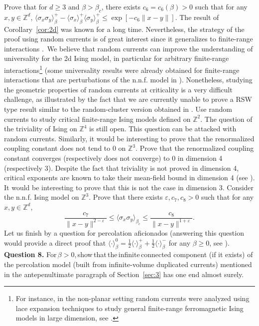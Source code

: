\documentclass[a4paper,oneside,11pt]{article}
\newcommand{\ee}{\end{equation}}
\newcommand{\be}{\begin{equation}}
\begin{document}
\medbreak
{} Prove that for $d\ge3$ and $\beta>\beta_c$, there exists $c_6=c_6(\beta)>0$ such that for any $x,y\in\mathbb Z^d$,
$
\langle \sigma_x\sigma_y\rangle_\beta^+-\langle \sigma_x\rangle_\beta^+\langle\sigma_y\rangle^+_\beta\le \exp[-c_6 \|x-y\|].
$
\medbreak
The result of Corollary~\ref{cor:2d} was known for a long time. Nevertheless, the strategy of the proof using random currents is of great interest since it generalizes to finite-range interactions \cite{AizDumWar16}.\ We believe that random currents can improve the understanding of universality for the 2d Ising model, in particular for arbitrary finite-range interactions\footnote{For instance, in the non-planar setting random currents were analyzed using lace expansion techniques to study general finite-range ferromagnetic Ising models in large dimension, see  \cite{Sak07}.} (some universality results were already obtained for finite-range interactions that are perturbations of the n.n.f. model in \cite{GiuGreMas12}). Nonetheless, studying the geometric properties of random currents at criticality is a very difficult challenge, as illustrated by the fact that we are currently unable to prove a RSW type result similar to the random-cluster version obtained in \cite{DumHonNol11}. 
\medbreak
{} Use random currents to study critical finite-range Ising models defined on $\mathbb Z^2$.
\medbreak
The question of the triviality of Ising on $\mathbb Z^4$ is still open. This question can be attacked with random currents. Similarly, it would be interesting to prove that the renormalized coupling constant does not tend to 0 on $\mathbb Z^3$.
\medbreak
{} Prove that the renormalized coupling constant converges (respectively does not converge) to 0 in dimension 4 (respectively 3).
\medbreak
Despite the fact that triviality is not proved in dimension 4, critical exponents are known to take their mean-field bound in dimension 4 (see \cite{AizFer86,AizFer88}). It would be interesting to prove that this is not the case in dimension 3. 
\medbreak
{} Consider the n.n.f. Ising model on $\mathbb Z^3$. Prove that there exists $\varepsilon,c_7,c_8>0$ such that for any $x,y\in\mathbb Z^d$,
\be\frac{c_7}{\|x-y\|^{2-\varepsilon}}\le \langle\sigma_x\sigma_y\rangle_{\beta_c}\le \frac{c_8}{\|x-y\|^{1+\varepsilon}}.\ee
\medbreak
Let us finish by a question for percolation aficionados (answering this question would provide a direct proof that 
$\langle\cdot\rangle_\beta^0=\tfrac12\langle\cdot\rangle_\beta^++\tfrac12\langle\cdot\rangle_\beta^-$ for any $\beta\ge0$, see \cite{AizDumSid15}). 
\medbreak\noindent
{\bf Question 8.} For\,$\beta>0$,\,show\,that\,the\,infinite\,connected component (if it exists) of the percolation model (built from infinite-volume duplicated currents) mentioned in the antepenultimate paragraph of Section~\ref{sec:3} has one end almost surely.
\end{document}
